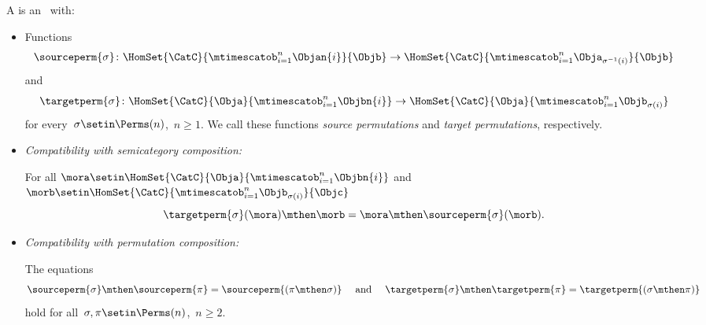 \begin{ctdefinition}
    \label{def:symmetric-stacking-category}
    A  is an  ~\CatC with:

    \constit

    \begin{itemize}
        \item Functions
              \begin{equation}
                  \sourceperm{\sigma} \colon \HomSet{\CatC}{\mtimescatob_{i=1}^n \Objan{i}}{\Objb} \to \HomSet{\CatC}{\mtimescatob_{i=1}^n \Obja_{\sigma^{-1}(i)}}{\Objb}
              \end{equation}
              and
              \begin{equation}
                  \targetperm{\sigma} \colon \HomSet{\CatC}{\Obja}{\mtimescatob_{i=1}^n \Objbn{i}} \to \HomSet{\CatC}{\Obja}{\mtimescatob_{i=1}^n \Objb_{\sigma(i)}}
              \end{equation}
              for every~$\sigma \setin \Perms(n)$,~$n \geq 1$.
              We call these functions \emph{source permutations} and \emph{target permutations}, respectively.
    \end{itemize}

    \condit

    \begin{itemize}

        \item \emph{Compatibility with semicategory composition:}

              For all $\mora \setin \HomSet{\CatC}{\Obja}{\mtimescatob_{i=1}^n \Objbn{i}}$ and $\morb \setin \HomSet{\CatC}{\mtimescatob_{i=1}^n \Objb_{\sigma(i)}}{\Objc}$
              \begin{equation}
                  \label{eq:perm-compatibility-with-composition}
                  \targetperm{\sigma} (\mora) \mthen \morb = \mora \mthen \sourceperm{\sigma}(\morb).
              \end{equation}

        \item \emph{Compatibility with permutation composition:}

              The equations
              \begin{equation}
                  \label{eq:perm-compatibility-with-perm-comp}
                  \sourceperm{\sigma} \mthen \sourceperm{\pi} = \sourceperm{(\pi\mthen\sigma)}
                  \quad \text{ and } \quad
                  \targetperm{\sigma} \mthen \targetperm{\pi} = \targetperm{(\sigma \mthen \pi)}
              \end{equation}
              hold for all~$\sigma, \pi \setin \Perms(n)$,~$n \geq 2$.


\end{itemize}
\end{ctdefinition}

